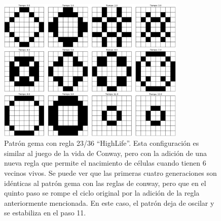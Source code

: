 \documentclass[12pt]{article}
\begin{document}
\begin{figure}
  \centering
  \includegraphics[width=0.8\textwidth]{imagenes/gema23-36.png}
  \caption{Patrón gema con regla 23/36 ``HighLife''. Esta configuración es similar al juego de la vida de Conway, pero con la adición de una nueva regla que permite el nacimiento de células cuando tienen 6 vecinos vivos. Se puede ver que las primeras cuatro generaciones son idénticas al patrón gema con las reglas de conway, pero que en el quinto paso se rompe el ciclo original por la adición de la regla anteriormente mencionada. En este caso, el patrón deja de oscilar y se estabiliza en el paso 11.\label{img:gema23-36}}
\end{figure}
\end{document}
